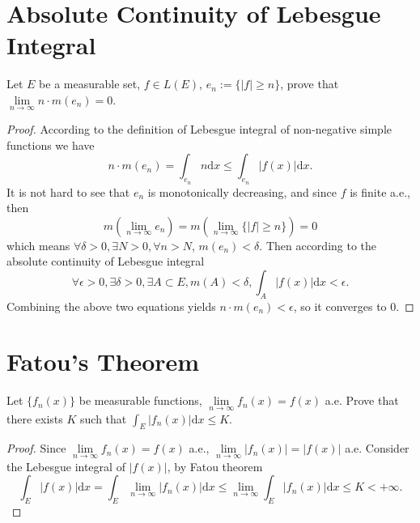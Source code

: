 \section{Absolute Continuity of Lebesgue Integral}

\begin{exercise}{}{}
  Let $E$ be a measurable set, $f \in L(E)$, $e_n := \{|f| \geq n\}$,
  prove that $\lim \limits _{n \rightarrow \infty} n \cdot m(e_n) = 0$.
\end{exercise}

\begin{proof}
  According to the definition of Lebesgue integral of non-negative simple
  functions we have
  \begin{equation}
    n \cdot m(e_n) = \int_{e_n} n \mathrm{d} x \leq \int_{e_n} |f(x)|\mathrm{d} x.
  \end{equation}
  It is not hard to see that $e_n$ is monotonically decreasing,
  and since $f$ is finite a.e., then
  \begin{equation}
    m(\lim \limits _{n \rightarrow \infty} e_n)
    = m(\lim \limits _{n \rightarrow \infty} \{|f| \geq n\}) = 0
  \end{equation}
  which means $\forall \delta > 0, \exists N > 0, \forall n > N$, $m(e_n) < \delta$.
  Then according to the absolute continuity of Lebesgue integral
  \begin{equation}
    \forall \epsilon > 0, \exists \delta > 0, \exists A \subset E, m(A) < \delta,
    \int_A |f(x)|\mathrm{d} x < \epsilon.
  \end{equation}
  Combining the above two equations yields $n\cdot m(e_n) < \epsilon$,
  so it converges to $0$.
\end{proof}

\section{Fatou's Theorem}

\begin{exercise}{}{}
  Let $\{f_n(x)\}$ be measurable functions, $\lim \limits _{n \rightarrow \infty} f_n(x) = f(x)$ a.e.
  Prove that there exists $K$ such that $\int_E |f_n(x)| \mathrm{d} x \leq K$.
\end{exercise}

\begin{proof}
  Since $\lim \limits _{n \rightarrow \infty} f_n(x) = f(x)$ a.e.,
  $\lim \limits _{n \rightarrow \infty} |f_n(x)| = |f(x)|$ a.e.
  Consider the Lebesgue integral of $|f(x)|$, by Fatou theorem
  \begin{equation}
    \int_E |f(x)|\mathrm{d} x = \int_E \lim \limits _{n \rightarrow \infty} |f_n(x)| \mathrm{d} x
    \leq \lim \limits _{n \rightarrow \infty} \int_E |f_n(x)|\mathrm{d} x \leq K < +\infty.
  \end{equation}
\end{proof}


